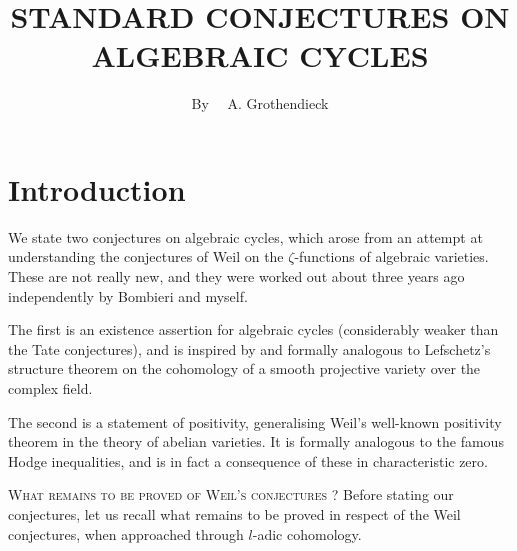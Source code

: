 \title{STANDARD CONJECTURES ON ALGEBRAIC CYCLES}

\author{By~~ A. Grothendieck}

\date{}

\maketitle

\setcounter{pageoriginal}{192}
\section{Introduction}\label{art09-sec1}\pageoriginale

We state two conjectures on algebraic cycles, which arose from an attempt at understanding the conjectures of Weil on the $\zeta$-functions of algebraic varieties. These are not really new, and they were worked out about three years ago independently by Bombieri and myself.

The first is an existence assertion for algebraic cycles (considerably weaker than the Tate conjectures), and is inspired by and formally analogous to Lefschetz's structure theorem on the cohomology of a smooth projective variety over the complex field.

The second is a statement of positivity, generalising Weil's well-known positivity theorem in the theory of abelian varieties. It is formally analogous to the famous Hodge inequalities, and is in fact a consequence of these in characteristic zero.

\textsc{What remains to be proved of Weil's conjectures ?} Before stating our conjectures, let us recall what remains to be proved in respect of the Weil conjectures, when approached through $l$-adic cohomology.

